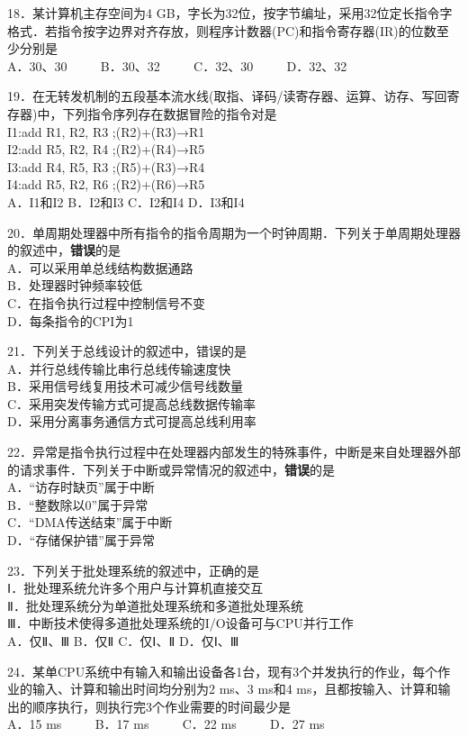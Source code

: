 18．某计算机主存空间为4 GB，字长为32位，按字节编址，采用32位定长指令字格式．若指令按字边界对齐存放，则程序计数器(PC)和指令寄存器(IR)的位数至少分别是 \\
A．30、30 $\qquad$ B．30、32 $\qquad$ C．32、30 $\qquad$ D．32、32

19．在无转发机制的五段基本流水线(取指、译码/读寄存器、运算、访存、写回寄存器)中，下列指令序列存在数据冒险的指令对是 \\
I1:add R1, R2, R3 ;(R2)+(R3)→R1 \\
I2:add R5, R2, R4 ;(R2)+(R4)→R5 \\
I3:add R4, R5, R3 ;(R5)+(R3)→R4 \\
I4:add R5, R2, R6 ;(R2)+(R6)→R5 \\
A．I1和I2 B．I2和I3 C．I2和I4 D．I3和I4

20．单周期处理器中所有指令的指令周期为一个时钟周期．下列关于单周期处理器的叙述中，\textbf{错误}的是 \\
A．可以采用单总线结构数据通路 \\
B．处理器时钟频率较低 \\
C．在指令执行过程中控制信号不变 \\
D．每条指令的CPI为1

21．下列关于总线设计的叙述中，错误的是 \\
A．并行总线传输比串行总线传输速度快 \\
B．采用信号线复用技术可减少信号线数量 \\
C．采用突发传输方式可提高总线数据传输率 \\
D．采用分离事务通信方式可提高总线利用率

22．异常是指令执行过程中在处理器内部发生的特殊事件，中断是来自处理器外部的请求事件．下列关于中断或异常情况的叙述中，\textbf{错误}的是 \\
A．“访存时缺页”属于中断 \\
B．“整数除以0”属于异常 \\
C．“DMA传送结束”属于中断 \\
D．“存储保护错”属于异常

23．下列关于批处理系统的叙述中，正确的是 \\
Ⅰ．批处理系统允许多个用户与计算机直接交互 \\
Ⅱ．批处理系统分为单道批处理系统和多道批处理系统 \\
Ⅲ．中断技术使得多道批处理系统的I/O设备可与CPU并行工作 \\
A．仅Ⅱ、Ⅲ B．仅Ⅱ C．仅Ⅰ、Ⅱ D．仅Ⅰ、Ⅲ

24．某单CPU系统中有输入和输出设备各1台，现有3个并发执行的作业，每个作业的输入、计算和输出时间均分别为2 ms、3 ms和4 ms，且都按输入、计算和输出的顺序执行，则执行完3个作业需要的时间最少是 \\
A．15 ms $\qquad$ B．17 ms $\qquad$ C．22 ms $\qquad$ D．27 ms

